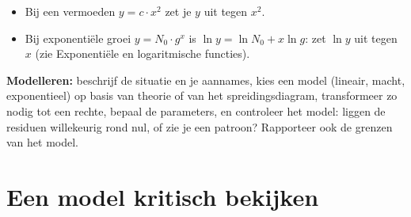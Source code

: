 \begin{itemize}
\item Bij een vermoeden $y = c \cdot x^2$ zet je $y$ uit tegen $x^2$.
\item Bij exponentiële groei $y = N_0 \cdot g^x$ is $\ln y = \ln N_0 + x\ln g$: zet $\ln y$ uit tegen $x$ (zie Exponentiële en logaritmische functies).
\end{itemize}


\begin{werkwijze}
\textbf{Modelleren:} beschrijf de situatie en je aannames, kies een model (lineair, macht, exponentieel) op basis van theorie of van het spreidingsdiagram, transformeer zo nodig tot een rechte, bepaal de parameters, en controleer het model: liggen de residuen willekeurig rond nul, of zie je een patroon? Rapporteer ook de grenzen van het model.
\end{werkwijze}

\begin{oefeningen}

\end{oefeningen}

\section{Een model kritisch bekijken}


